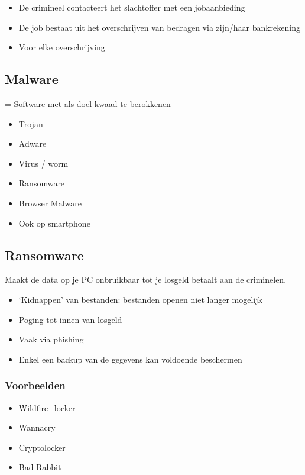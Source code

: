 \documentclass{article}
\begin{document}
\begin{itemize}
    \item De crimineel contacteert het slachtoffer met een jobaanbieding
    \item De job bestaat uit het overschrijven van bedragen via zijn/haar bankrekening
    \item Voor elke overschrijving 
\end{itemize}

\subsection{Malware}
= Software met als doel kwaad te berokkenen

\begin{itemize}
    \item Trojan
    \item Adware
    \item Virus / worm
    \item Ransomware
    \item Browser Malware
    \item Ook op smartphone
\end{itemize}

\subsection{Ransomware}
Maakt de data op je PC onbruikbaar tot je losgeld betaalt aan de criminelen.

\begin{itemize}
    \item `Kidnappen' van bestanden: bestanden openen niet langer mogelijk
    \item Poging tot innen van losgeld
    \item Vaak via phishing
    \item Enkel een backup van de gegevens kan voldoende beschermen
\end{itemize}

\subsubsection{Voorbeelden}

\begin{itemize}
    \item Wildfire\_locker
    \item Wannacry
    \item Cryptolocker
    \item Bad Rabbit
\end{itemize}
\end{document}
